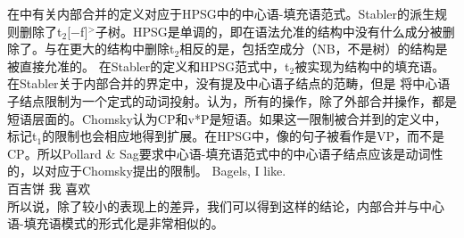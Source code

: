 在中有关内部合并的定义对应于HPSG中的中心语-填充语范式\citep[]{ps2}。Stabler的派生规则删除了t$_2$[$-$f]$^>$子树。HPSG是单调的，即在语法允准的结构中没有什么成分被删除了。与在更大的结构中删除t$_2$相反的是，包括空成分（NB，不是树）的结构是被直接允准的。 在Stabler的定义和HPSG范式中，t$_2$被实现为结构中的填充语。在Stabler关于内部合并的界定中，没有提及中心语子结点的范畴，但是 \citet[]{ps2}将中心语子结点限制为一个定式的动词投射。\citet[]{Chomsky2007a}认为，所有的操作，除了外部合并操作，都是短语层面的。Chomsky认为CP和v*P是短语。如果这一限制被合并到的定义中，标记t$_1$的限制也会相应地得到扩展。在HPSG中，像的句子被看作是VP，而不是CP。所以Pollard \& Sag要求中心语-填充语范式中的中心语子结点应该是动词性的，以对应于Chomsky提出的限制。
\ea
\gll Bagels, I like.\\
百吉饼 我 喜欢\\
\z
所以说，除了较小的表现上的差异，我们可以得到这样的结论，内部合并与中心语-填充语模式的形式化是非常相似的。

